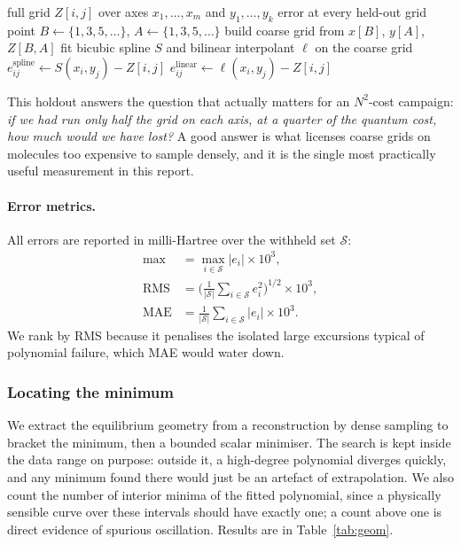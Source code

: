 \documentclass[sigconf,screen,nonacm]{acmart}
\begin{document}
\begin{algorithm}[!ht]
\caption{Half-grid holdout for a 2-D surface}
\label{alg:holdout}
\begin{algorithmic}[1]\small
\Require full grid $Z[i,j]$ over axes $x_1,\dots,x_m$ and $y_1,\dots,y_k$
\Ensure error at every held-out grid point
\State $B \gets \{1,3,5,\dots\}$, \quad $A \gets \{1,3,5,\dots\}$
\State build coarse grid from $x[B]$, $y[A]$, $Z[B,A]$
\State fit bicubic spline $S$ and bilinear interpolant $\ell$ on the coarse
  grid
  \State $e^{\text{spline}}_{ij} \gets S(x_i,y_j) - Z[i,j]$
  \State $e^{\text{linear}}_{ij} \gets \ell(x_i,y_j) - Z[i,j]$
\EndFor
\end{algorithmic}
\end{algorithm}

This holdout answers the question that actually matters for an $N^2$-cost
campaign: \emph{if we had run only half the grid on each axis, at a quarter
of the quantum cost, how much would we have lost?} A good answer is what
licenses coarse grids on molecules too expensive to sample densely, and it
is the single most practically useful measurement in this report.

\paragraph{Error metrics.}
All errors are reported in milli-Hartree over the withheld set
$\mathcal{S}$:
\begin{align}
\text{max} &= \max_{i\in\mathcal{S}} |e_i| \times 10^3, \\
\text{RMS} &= \Big(\tfrac{1}{|\mathcal{S}|}\textstyle\sum_{i\in\mathcal{S}} e_i^2\Big)^{1/2}\times 10^3, \\
\text{MAE} &= \tfrac{1}{|\mathcal{S}|}\textstyle\sum_{i\in\mathcal{S}} |e_i| \times 10^3 .
\end{align}
We rank by RMS because it penalises the isolated large excursions typical of
polynomial failure, which MAE would water down.

\subsubsection{Locating the minimum}

We extract the equilibrium geometry from a reconstruction by dense sampling
to bracket the minimum, then a bounded scalar minimiser. The search is kept
inside the data range on purpose: outside it, a high-degree polynomial
diverges quickly, and any minimum found there would just be an artefact of
extrapolation. We also count the number of interior minima of the fitted
polynomial, since a physically sensible curve over these intervals should
have exactly one; a count above one is direct evidence of spurious
oscillation. Results are in Table~\ref{tab:geom}.
\end{document}
